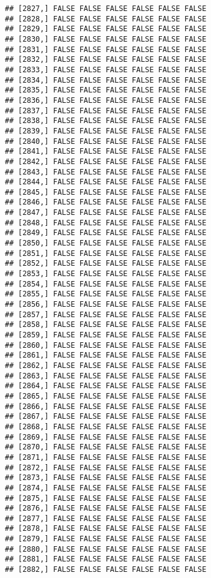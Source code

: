 \documentclass[
]{article}
\begin{document}
\begin{verbatim}
## [2827,] FALSE FALSE FALSE FALSE FALSE FALSE
## [2828,] FALSE FALSE FALSE FALSE FALSE FALSE
## [2829,] FALSE FALSE FALSE FALSE FALSE FALSE
## [2830,] FALSE FALSE FALSE FALSE FALSE FALSE
## [2831,] FALSE FALSE FALSE FALSE FALSE FALSE
## [2832,] FALSE FALSE FALSE FALSE FALSE FALSE
## [2833,] FALSE FALSE FALSE FALSE FALSE FALSE
## [2834,] FALSE FALSE FALSE FALSE FALSE FALSE
## [2835,] FALSE FALSE FALSE FALSE FALSE FALSE
## [2836,] FALSE FALSE FALSE FALSE FALSE FALSE
## [2837,] FALSE FALSE FALSE FALSE FALSE FALSE
## [2838,] FALSE FALSE FALSE FALSE FALSE FALSE
## [2839,] FALSE FALSE FALSE FALSE FALSE FALSE
## [2840,] FALSE FALSE FALSE FALSE FALSE FALSE
## [2841,] FALSE FALSE FALSE FALSE FALSE FALSE
## [2842,] FALSE FALSE FALSE FALSE FALSE FALSE
## [2843,] FALSE FALSE FALSE FALSE FALSE FALSE
## [2844,] FALSE FALSE FALSE FALSE FALSE FALSE
## [2845,] FALSE FALSE FALSE FALSE FALSE FALSE
## [2846,] FALSE FALSE FALSE FALSE FALSE FALSE
## [2847,] FALSE FALSE FALSE FALSE FALSE FALSE
## [2848,] FALSE FALSE FALSE FALSE FALSE FALSE
## [2849,] FALSE FALSE FALSE FALSE FALSE FALSE
## [2850,] FALSE FALSE FALSE FALSE FALSE FALSE
## [2851,] FALSE FALSE FALSE FALSE FALSE FALSE
## [2852,] FALSE FALSE FALSE FALSE FALSE FALSE
## [2853,] FALSE FALSE FALSE FALSE FALSE FALSE
## [2854,] FALSE FALSE FALSE FALSE FALSE FALSE
## [2855,] FALSE FALSE FALSE FALSE FALSE FALSE
## [2856,] FALSE FALSE FALSE FALSE FALSE FALSE
## [2857,] FALSE FALSE FALSE FALSE FALSE FALSE
## [2858,] FALSE FALSE FALSE FALSE FALSE FALSE
## [2859,] FALSE FALSE FALSE FALSE FALSE FALSE
## [2860,] FALSE FALSE FALSE FALSE FALSE FALSE
## [2861,] FALSE FALSE FALSE FALSE FALSE FALSE
## [2862,] FALSE FALSE FALSE FALSE FALSE FALSE
## [2863,] FALSE FALSE FALSE FALSE FALSE FALSE
## [2864,] FALSE FALSE FALSE FALSE FALSE FALSE
## [2865,] FALSE FALSE FALSE FALSE FALSE FALSE
## [2866,] FALSE FALSE FALSE FALSE FALSE FALSE
## [2867,] FALSE FALSE FALSE FALSE FALSE FALSE
## [2868,] FALSE FALSE FALSE FALSE FALSE FALSE
## [2869,] FALSE FALSE FALSE FALSE FALSE FALSE
## [2870,] FALSE FALSE FALSE FALSE FALSE FALSE
## [2871,] FALSE FALSE FALSE FALSE FALSE FALSE
## [2872,] FALSE FALSE FALSE FALSE FALSE FALSE
## [2873,] FALSE FALSE FALSE FALSE FALSE FALSE
## [2874,] FALSE FALSE FALSE FALSE FALSE FALSE
## [2875,] FALSE FALSE FALSE FALSE FALSE FALSE
## [2876,] FALSE FALSE FALSE FALSE FALSE FALSE
## [2877,] FALSE FALSE FALSE FALSE FALSE FALSE
## [2878,] FALSE FALSE FALSE FALSE FALSE FALSE
## [2879,] FALSE FALSE FALSE FALSE FALSE FALSE
## [2880,] FALSE FALSE FALSE FALSE FALSE FALSE
## [2881,] FALSE FALSE FALSE FALSE FALSE FALSE
## [2882,] FALSE FALSE FALSE FALSE FALSE FALSE

\end{verbatim}
\end{document}
